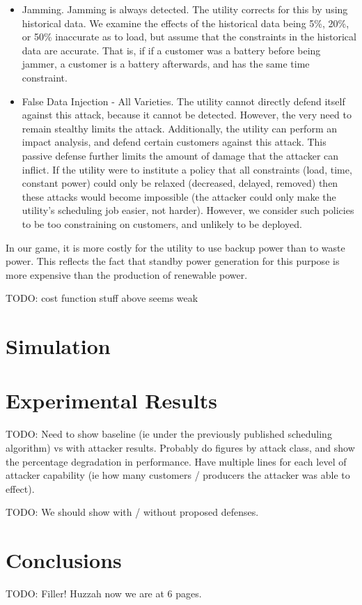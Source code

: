 \documentclass[conference]{IEEEtran}
\begin{document}
\begin{itemize}
\item Jamming. Jamming is always detected. The utility corrects for this by using historical data. We examine the effects 
of the historical data being 5\%, 20\%, or 50\% inaccurate as to load, but assume that the constraints in the historical data are accurate. That is, if if a customer was a battery before being jammer, a customer is a battery afterwards, and has the same time constraint.

\item False Data Injection - All Varieties. The utility cannot directly defend itself against this attack, because it cannot be detected. However, the very need to remain stealthy limits the attack. Additionally, the utility can perform an impact analysis, and defend certain customers against this attack. This passive defense further limits the amount of damage that the attacker can inflict. If the utility were to institute a policy that all constraints (load, time, constant power) could only be relaxed (decreased, delayed, removed) then these attacks would become impossible (the attacker could only make the utility's scheduling job easier, not harder). However, we consider such policies to be too constraining on customers, and unlikely to be deployed.

\end{itemize}

In our game, it is more costly for the utility to use backup power than to waste power. This reflects the fact that standby power generation for this purpose is more expensive than the production of renewable power.

TODO: cost function stuff above seems weak

\section{Simulation}
\label{Simulation}


\section{Experimental Results}
\label{Experimental Results}

TODO: Need to show baseline (ie under the previously published scheduling algorithm) vs with attacker results. Probably
do figures by attack class, and show the percentage degradation in performance. Have multiple lines for each level of attacker
capability (ie how many customers / producers the attacker was able to effect).

TODO: We should show with / without proposed defenses.


\section{Conclusions}
\label{Conclusions}

TODO:  Filler!  Huzzah now we are at 6 pages.



\end{document}

